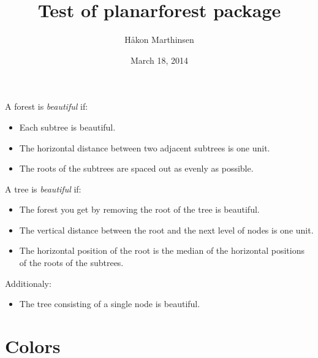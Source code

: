 \documentclass[a4paper, 11pt, pdftex]{scrartcl}
\begin{document}
\title{Test of planarforest package}
\author{Håkon Marthinsen}
\date{March 18, 2014}
\maketitle



\noindent
A forest is \emph{beautiful} if:
\begin{itemize}
	\item Each subtree is beautiful.
	\item The horizontal distance between two adjacent subtrees is one unit.
	\item The roots of the subtrees are spaced out as evenly as possible.
\end{itemize}
A tree is \emph{beautiful} if:
\begin{itemize}
	\item The forest you get by removing the root of the tree is beautiful.
	\item The vertical distance between the root and the next level of nodes is one unit.
	\item The horizontal position of the root is the median of the horizontal positions of the roots of the subtrees.
\end{itemize}
Additionaly:
\begin{itemize}
	\item The tree consisting of a single node is beautiful.
\end{itemize}


\section*{Colors}
\end{document}
